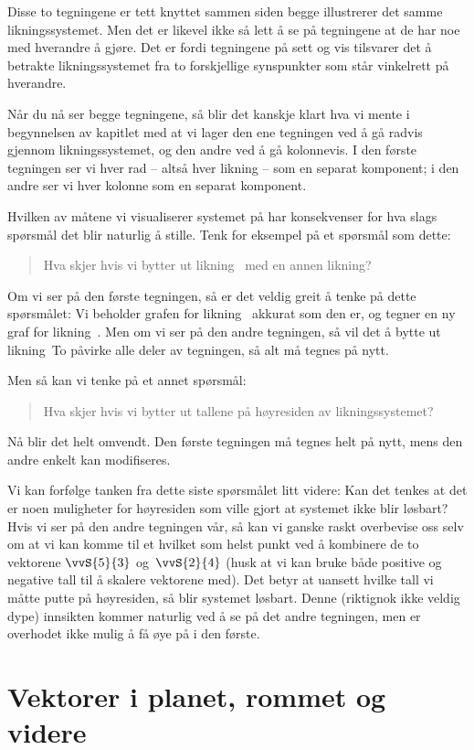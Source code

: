 Disse to tegningene er tett knyttet sammen siden begge illustrerer det
samme likningssystemet.  Men det er likevel ikke så lett å se på
tegningene at de har noe med hverandre å gjøre.  Det er fordi
tegningene på sett og vis tilsvarer det å betrakte likningssystemet
fra to forskjellige synspunkter som står vinkelrett på hverandre.

Når du nå ser begge tegningene, så blir det kanskje klart hva vi mente
i begynnelsen av kapitlet med at vi lager den ene tegningen ved å gå
radvis gjennom likningssystemet, og den andre ved å gå kolonnevis.  I
den første tegningen ser vi hver rad -- altså hver likning -- som en
separat komponent; i den andre ser vi hver kolonne som en separat
komponent.

Hvilken av måtene vi visualiserer systemet på har konsekvenser for hva
slags spørsmål det blir naturlig å stille.  Tenk for eksempel på et
spørsmål som dette:
\begin{quote}
Hva skjer hvis vi bytter ut likning~\To{} med en annen likning?
\end{quote}
Om vi ser på den første tegningen, så er det veldig greit å tenke på
dette spørsmålet: Vi beholder grafen for likning~\En{} akkurat som den
er, og tegner en ny graf for likning~\To.  Men om vi ser på den andre
tegningen, så vil det å bytte ut likning~To{} påvirke alle deler av
tegningen, så alt må tegnes på nytt.

Men så kan vi tenke på et annet spørsmål:
\begin{quote}
Hva skjer hvis vi bytter ut tallene på høyresiden av likningssystemet?
\end{quote}
Nå blir det helt omvendt.  Den første tegningen må tegnes helt på
nytt, mens den andre enkelt kan modifiseres.

Vi kan forfølge tanken fra dette siste spørsmålet litt videre: Kan det
tenkes at det er noen muligheter for høyresiden som ville gjort at
systemet ikke blir løsbart?  Hvis vi ser på den andre tegningen vår,
så kan vi ganske raskt overbevise oss selv om at vi kan komme til et
hvilket som helst punkt ved å kombinere de to vektorene $\vvS{5}{3}$
og~$\vvS{2}{4}$ (husk at vi kan bruke både positive og negative tall
til å skalere vektorene med).  Det betyr at uansett hvilke tall vi
måtte putte på høyresiden, så blir systemet løsbart.  Denne (riktignok
ikke veldig dype) innsikten kommer naturlig ved å se på det andre
tegningen, men er overhodet ikke mulig å få øye på i den første.


\section*{Vektorer i planet, rommet og videre}

